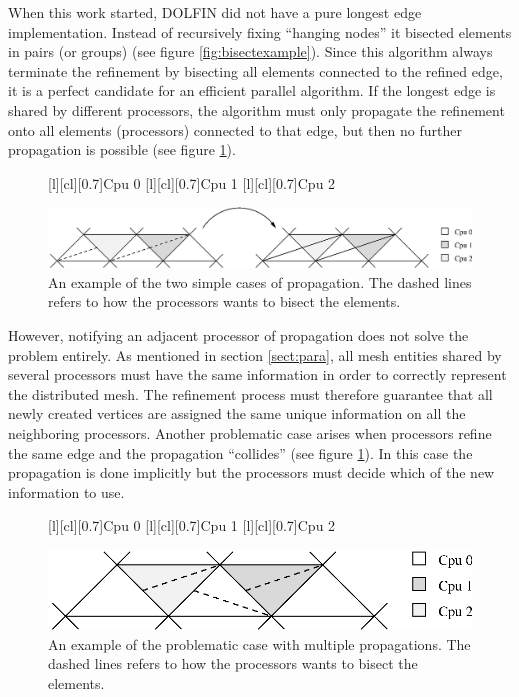 When this work started, DOLFIN did not have a pure longest edge
implementation. Instead of recursively fixing ``hanging nodes'' it
bisected elements in pairs (or groups) (see figure
\ref{fig:bisectexample}). Since this algorithm always terminate the
refinement by bisecting all elements connected to the refined edge, it
is a perfect candidate for an efficient parallel algorithm. If the
longest edge is shared by different processors, the algorithm must
only propagate the refinement onto all elements (processors) connected
to that edge, but then no further propagation is possible (see figure
\ref{fig:prop}).
\begin{figure}[htb]
 [l][cl][0.7]{Cpu 0}
 [l][cl][0.7]{Cpu 1}
 [l][cl][0.7]{Cpu 2}
  \begin{center}
    \includegraphics[width=0.95\columnwidth]{chapters/hoffman-4/eps/prop.eps}
  \end{center}
   \caption{An example of the two simple cases of propagation. The dashed lines refers to how the processors wants to bisect the elements.}
   \label{fig:prop}
\end{figure}

However, notifying an adjacent processor of propagation does not solve
the problem entirely. As mentioned in section \ref{sect:para}, all
mesh entities shared by several processors must have the same
information in order to correctly represent the distributed mesh. The
refinement process must therefore guarantee that all newly created
vertices are assigned the same unique information on all the
neighboring processors. Another problematic case arises when
processors refine the same edge and the propagation ``collides'' (see
figure \ref{fig:prop}). In this case the propagation is done
implicitly but the processors must decide which of the new information
to use.
\begin{figure}[htb]
 [l][cl][0.7]{Cpu 0} [l][cl][0.7]{Cpu 1}
 [l][cl][0.7]{Cpu 2} \begin{center}
 \includegraphics[width=0.65\columnwidth]{chapters/hoffman-4/eps/propprob.eps}
 \end{center} \caption{An example of the problematic case with
 multiple propagations. The dashed lines refers to how the processors
 wants to bisect the elements.}  \label{fig:propprob}
\end{figure}

